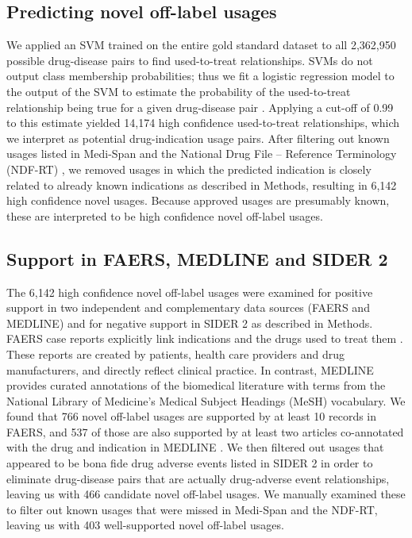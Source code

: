 \subsection{Predicting novel off-label usages}
We applied an SVM trained on the entire gold standard dataset to all
2,362,950 possible drug-disease pairs to find used-to-treat
relationships.  SVMs do not output class membership probabilities;
thus we fit a logistic regression model to the output of the SVM to
estimate the probability of the used-to-treat relationship being true
for a given drug-disease pair \cite{Platt1999}.  Applying a cut-off of
0.99 to this estimate yielded 14,174 high confidence used-to-treat
relationships, which we interpret as potential drug-indication usage
pairs.  After filtering out known usages listed in Medi-Span and the
National Drug File – Reference Terminology (NDF-RT) \cite{Brown2004},
we removed usages in which the predicted indication is closely related
to already known indications as described in Methods, resulting in
6,142 high confidence novel usages.  Because approved usages are
presumably known, these are interpreted to be high confidence novel
off-label usages.

\subsection{Support in FAERS, MEDLINE and SIDER 2}
The 6,142 high confidence novel off-label usages were examined for
positive support in two independent and complementary data sources
(FAERS and MEDLINE) and for negative support in SIDER 2 as described
in Methods.  FAERS case reports explicitly link indications and the
drugs used to treat them \cite{WeissSmith2011}.  These reports are
created by patients, health care providers and drug manufacturers, and
directly reflect clinical practice.  In contrast, MEDLINE provides
curated annotations of the biomedical literature with terms from the
National Library of Medicine’s Medical Subject Headings (MeSH)
vocabulary.  We found that 766 novel off-label usages are supported by
at least 10 records in FAERS, and 537 of those are also supported by
at least two articles co-annotated with the drug and indication in
MEDLINE \cite{Avillach2013}.  We then filtered out usages that
appeared to be bona fide drug adverse events listed in SIDER 2 in
order to eliminate drug-disease pairs that are actually drug-adverse
event relationships, leaving us with 466 candidate novel off-label
usages.  We manually examined these to filter out known usages that
were missed in Medi-Span and the NDF-RT, leaving us with 403
well-supported novel off-label usages.


